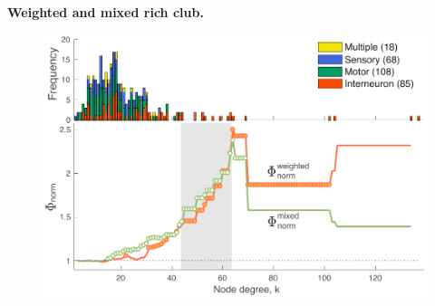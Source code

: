 \documentclass[10pt,letterpaper]{article}
\begin{document}
{%
{\bf Weighted and mixed rich club.}
\begin{figure}[h]
\centering
    \includegraphics[width=1\textwidth]{weightedRCALL.pdf}

\end{figure}}
\end{document}
